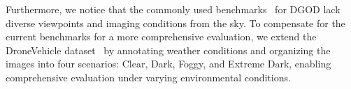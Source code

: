 

Furthermore, we notice that the commonly used benchmarks~\cite{cordts2016cityscapes,yu2020bdd100k,sakaridis2018semantic,everingham2010pascal,inoue2018cross,wu2022single} for DGOD lack diverse viewpoints and imaging conditions from the sky.
To compensate for the current benchmarks for a more comprehensive evaluation, we extend the DroneVehicle dataset~\cite{sun2022drone} by annotating weather conditions and organizing the images into four scenarios: Clear, Dark, Foggy, and Extreme Dark, enabling comprehensive evaluation under varying environmental conditions.%



